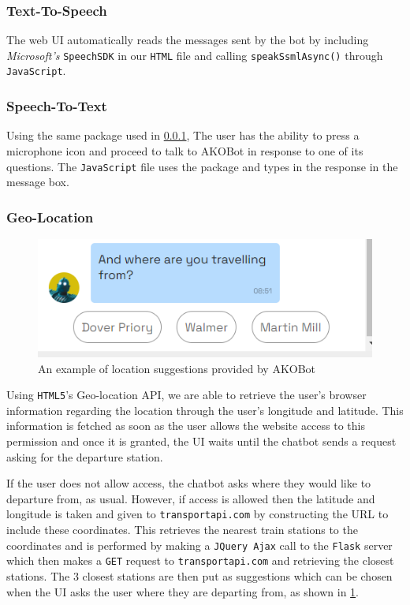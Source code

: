 \documentclass[11pt]{article}
\newcommand{\code}[1]{{\texttt{#1}}}
\begin{document}
        \subsubsection{Text-To-Speech}\label{sec:texttospeech}
        The web UI automatically reads the messages sent by the bot by including \textit{Microsoft's} \code{SpeechSDK} in our \code{HTML} file and calling \code{speakSsmlAsync()} through \code{JavaScript}.
        
        \subsubsection{Speech-To-Text}
        Using the same package used in \cref{sec:texttospeech}, The user has the ability to press a microphone icon and proceed to talk to AKOBot in response to one of its questions. The \code{JavaScript} file uses the package and types in the response in the message box.

        \subsubsection{Geo-Location}
        
        \begin{figure}[!ht]
    \centering
    \includegraphics{LocationSuggestions.png}
    \caption{An example of location suggestions provided by AKOBot}
    \label{fig:suggestloc}
\end{figure}
        
        Using \code{HTML5}'s Geo-location API, we are able to retrieve the user's browser information regarding the location through the user's longitude and latitude. This information is fetched as soon as the user allows the website access to this permission and once it is granted, the UI waits until the chatbot sends a request asking for the departure station.

        If the user does not allow access, the chatbot asks where they would like to departure from, as usual. However, if access is allowed then the latitude and longitude is taken and given to \code{transportapi.com} by constructing the URL to include these coordinates. This retrieves the nearest train stations to the coordinates and is performed by making a \code{JQuery Ajax} call to the \code{Flask} server which then makes a \code{GET} request to \code{transportapi.com} and retrieving the closest stations. The 3 closest stations are then put as suggestions which can be chosen when the UI asks the user where they are departing from, as shown in \cref{fig:suggestloc}.
        
\end{document}
